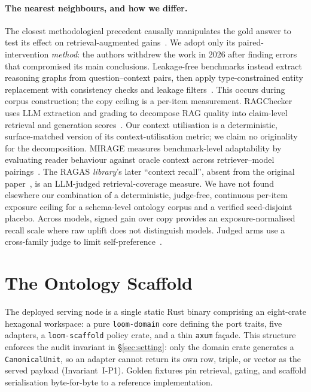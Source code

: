 \documentclass[10pt,twocolumn]{article}
\begin{document}
\paragraph{The nearest neighbours, and how we differ.}
The closest methodological precedent causally manipulates the gold answer to test its effect on retrieval-augmented gains~\cite{answerpresence2026}. We adopt only its paired-intervention \emph{method}: the authors withdrew the work in 2026 after finding errors that compromised its main conclusions. Leakage-free benchmarks instead extract reasoning graphs from question--context pairs, then apply type-constrained entity replacement with consistency checks and leakage filters~\cite{seedrg2026}. This occurs during corpus construction; the copy ceiling is a per-item measurement. RAGChecker uses LLM extraction and grading to decompose RAG quality into claim-level retrieval and generation scores~\cite{ragchecker2024}. Our context utilisation is a deterministic, surface-matched version of its context-utilisation metric; we claim no originality for the decomposition. MIRAGE measures benchmark-level adaptability by evaluating reader behaviour against oracle context across retriever--model pairings~\cite{mirage2025}. The RAGAS \emph{library}'s later ``context recall'', absent from the original paper~\cite{es2023ragas}, is an LLM-judged retrieval-coverage measure. We have not found elsewhere our combination of a deterministic, judge-free, continuous per-item exposure ceiling for a schema-level ontology corpus and a verified seed-disjoint placebo. Across models, signed gain over copy provides an exposure-normalised recall scale where raw uplift does not distinguish models. Judged arms use a cross-family judge to limit self-preference~\cite{zheng2023judging,panickssery2024selfpreference}.


\section{The Ontology Scaffold}\label{sec:system}
The deployed serving node is a single static Rust binary comprising an eight-crate hexagonal workspace: a pure \texttt{loom-domain} core defining the port traits, five adapters, a \texttt{loom-scaffold} policy crate, and a thin \texttt{axum} façade. This structure enforces the audit invariant in \S\ref{sec:setting}: only the domain crate generates a \texttt{CanonicalUnit}, so an adapter cannot return its own row, triple, or vector as the served payload (Invariant~I-P1). Golden fixtures pin retrieval, gating, and scaffold serialisation byte-for-byte to a reference implementation.
\end{document}
